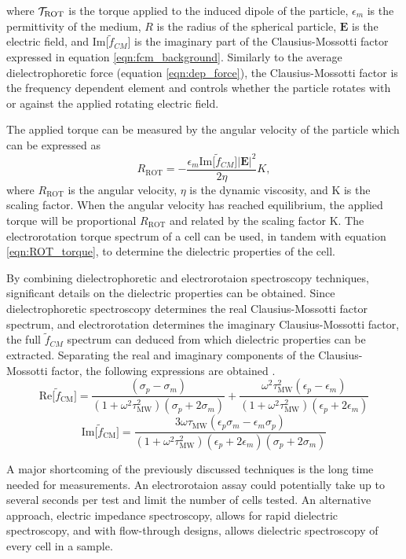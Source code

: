  \noindent where $\mathcal{T}_{\text{ROT}}$ is the torque applied to the induced dipole of the particle, $\epsilon_m$ is the permittivity of the medium, $R$ is the radius of the spherical particle, $\textbf{E}$ is the electric field, and $\text{Im}\big[\tilde{f}_{CM}\big]$ is the imaginary part of the Clausius-Mossotti factor expressed in equation \ref{eqn:fcm_background}. Similarly to the average dielectrophoretic force (equation \ref{eqn:dep_force}), the Clausius-Mossotti factor is the frequency dependent element and controls whether the particle rotates with or against the applied rotating electric field.
 
 \par The applied torque can be measured by the angular velocity of the particle which can be expressed as \cite{morgan_ac_2003}
 \begin{equation}
     R_{\text{ROT}} = - \frac{\epsilon_m\text{Im}\big[\tilde{f}_{CM}\big]|\textbf{E}|^2}{2\eta}K, 
 \end{equation}
 \noindent where $R_{\text{ROT}}$ is the angular velocity, $\eta$ is the dynamic viscosity, and K is the scaling factor. When the angular velocity has reached equilibrium, the applied torque will be proportional $R_{\text{ROT}}$ and related by the scaling factor K. The electrorotation torque spectrum of a cell can be used, in tandem with equation \ref{eqn:ROT_torque}, to determine the dielectric properties of the cell. 
 
 \par By combining dielectrophoretic and electrorotaion spectroscopy techniques, significant details on the dielectric properties can be obtained. Since dielectrophoretic spectroscopy determines the real Clausius-Mossotti factor spectrum, and electrorotation determines the imaginary Clausius-Mossotti factor, the full $\tilde{f}_{CM}$ spectrum can deduced from which dielectric properties can be extracted. Separating the real and imaginary components of the Clausius-Mossotti factor, the following expressions are obtained \cite{hober_zweites_1912, morgan_single_2007}.
 \begin{equation}
     \text{Re}\big[\tilde{f}_{\text{CM}}\big] = \frac{(\sigma_p - \sigma_m)}{(1+\omega^2\tau_{\text{MW}}^2)(\sigma_p + 2\sigma_m)} + \frac{\omega^2\tau^2_{\text{MW}}(\epsilon_p-\epsilon_m)}{(1+\omega^2\tau_{\text{MW}}^2)(\epsilon_p+2\epsilon_m)}
 \end{equation}
 \begin{equation}
     \text{Im}\big[\tilde{f}_{\text{CM}} \big] = \frac{3\omega\tau_{\text{MW}}(\epsilon_p\sigma_m-\epsilon_m\sigma_p)}{(1+\omega^2\tau^2_{\text{MW}})(\epsilon_p+2\epsilon_m)(\sigma_p+2\sigma_m)}
 \end{equation}
 \par A major shortcoming of the previously discussed techniques is the long time needed for measurements. An electrorotaion assay could potentially take up to several seconds per test and limit the number of cells tested. An alternative approach, electric impedance spectroscopy, allows for rapid dielectric spectroscopy, and with flow-through designs, allows dielectric spectroscopy of every cell in a sample. 
 
